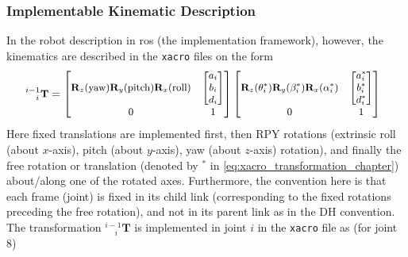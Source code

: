 \subsubsection{Implementable Kinematic Description}
In the robot description in \gls{ros} (the implementation framework), however, the kinematics are described in the \texttt{xacro} files on the form
\begin{equation}
\hspace*{-2mm}
\small
^{i-1}_{\phantom{-1}i}\textbf{T} =
\begin{bmatrix}
\textbf{R}_z(\text{yaw})\textbf{R}_y(\text{pitch})\textbf{R}_x(\text{roll}) & \begin{bmatrix}a_i\\ b_i\\ d_i\end{bmatrix}\\
0 & 1
\end{bmatrix}
\begin{bmatrix}
\textbf{R}_z(\theta_i^*)\textbf{R}_y(\beta_i^*)\textbf{R}_x(\alpha_i^*) & \begin{bmatrix}a_i^*\\ b_i^*\\ d_i^* \end{bmatrix}\\
0 & 1
\end{bmatrix}
\label{eq:xacro_transformation_chapter}
\end{equation}
Here fixed translations are implemented first, then RPY rotations (extrinsic roll (about $x$-axis), pitch (about $y$-axis), yaw (about $z$-axis) rotation), and finally the free rotation or translation (denoted by $^*$ in \autoref{eq:xacro_transformation_chapter}) about/along one of the rotated axes. Furthermore, the convention here is that each frame (joint) is fixed in its child link (corresponding to the fixed rotations preceding the free rotation), and not in its parent link as in the DH convention. The transformation  $^{i-1}_{\phantom{-1}i} \textbf{T}$ is implemented in joint $i$ in the \texttt{xacro} file  as (for joint 8)

